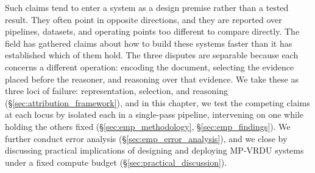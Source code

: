 Such claims tend to enter a system as a design premise rather than a tested result. They often point in opposite directions, and they are reported over pipelines, datasets, and operating points too different to compare directly. The field has gathered claims about how to build these systems faster than it has established which of them hold. The three disputes are separable because each concerns a different operation: encoding the document, selecting the evidence placed before the reasoner, and reasoning over that evidence. We take these as three loci of failure: representation, selection, and reasoning (\S\ref{sec:attribution_framework}), and in this chapter, we test the competing claims at each locus by isolated each in a single-pass pipeline, intervening on one while holding the others fixed (\S\ref{sec:emp_methodology}, \S\ref{sec:emp_findings}). We further conduct error analysis (\S\ref{sec:emp_error_analysis}), and we close by  discussing practical implications of designing and deploying MP-VRDU systems under a fixed compute budget (\S\ref{sec:practical_discussion}).


